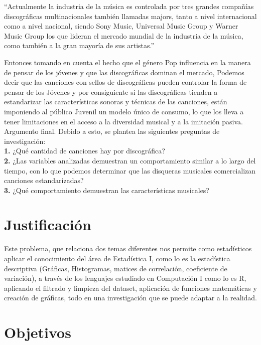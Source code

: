\documentclass[oneside,11pt]{Latex/Classes/PhDthesisPSnPDF}
\begin{document}
``Actualmente la industria de la música es controlada por tres grandes
compañías discográficas multinacionales también llamadas majors, tanto a
nivel internacional como a nivel nacional, siendo Sony Music, Universal
Music Group y Warner Music Group los que lideran el mercado mundial de
la industria de la música, como también a la gran mayoría de sus
artistas.''

Entonces tomando en cuenta el hecho que el género Pop influencia en la
manera de pensar de los jóvenes y que las discográficas dominan el
mercado, Podemos decir que las canciones con sellos de discográficas
pueden controlar la forma de pensar de los Jóvenes y por consiguiente si
las discográficas tienden a estandarizar las características sonoras y
técnicas de las canciones, están imponiendo al público Juvenil un modelo
único de consumo, lo que los lleva a tener limitaciones en el acceso a
la diversidad musical y a la imitación pasiva.\\

Argumento final. Debido a esto, se plantea las siguientes preguntas de
investigación:\\

\textbf{1.} ¿Qué cantidad de canciones hay por discográfica?\\

\textbf{2.} ¿Las variables analizadas demuestran un comportamiento
similar a lo largo del tiempo, con lo que podemos determinar que las
disqueras musicales comercializan canciones estandarizadas?\\

\textbf{3.} ¿Qué comportamiento demuestran las características
musicales?\\

\section{Justificación}

Este problema, que relaciona dos temas diferentes nos permite como
estadísticos aplicar el conocimiento del área de Estadística I, como lo
es la estadística descriptiva (Gráficas, Histogramas, matices de
correlación, coeficiente de variación), a través de los lenguajes
estudiado en Computación I como lo es R, aplicando el filtrado y
limpieza del dataset, aplicación de funciones matemáticas y creación de
gráficas, todo en una investigación que se puede adaptar a la
realidad.\\

\section{Objetivos}
\end{document}
